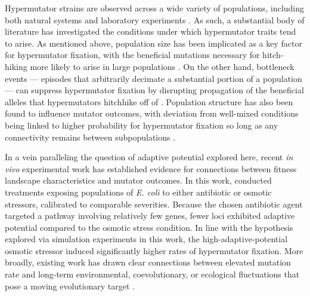 Hypermutator strains are observed across a wide variety of populations, including both natural systems and laboratory experiments \citep{sniegowski1997evolution,swings2017adaptive,maddamsetti2020divergent,cherry2018methylation,notleymcrobb2002enrichment,shaver2002fitness,voordeckers2015adaptation,leclerc1996high}.
As such, a substantial body of literature has investigated the conditions under which hypermutator traits tend to arise.
As mentioned above, population size has been implicated as a key factor for hypermutator fixation, with the beneficial mutations necessary for hitch-hiking more likely to arise in large populations \citep{raynes2018sign}.
On the other hand, bottleneck events --- episodes that arbitrarily decimate a substantial portion of a population --- can suppress hypermutator fixation by disrupting propagation of the beneficial alleles that hypermutators hitchhike off of \citep{raynes2013effect}.
Population structure has also been found to influence mutator outcomes, with deviation from well-mixed conditions being linked to higher probability for hypermutator fixation so long as any connectivity remains between subpopulations \citep{raynes2019migration}.

In a vein paralleling the question of adaptive potential explored here, recent \textit{in vivo} experimental work has established evidence for connections between fitness landscape characteristics and mutator outcomes.
In this work, \citet{callens2023hypermutator} conducted treatments exposing populations of \textit{E. coli} to either antibiotic or osmotic stressors, calibrated to comparable severities.
Because the chosen antibiotic agent targeted a pathway involving relatively few genes, fewer loci exhibited adaptive potential compared to the osmotic stress condition.
In line with the hypothesis explored via simulation experiments in this work, the high-adaptive-potential osmotic stressor induced significantly higher rates of hypermutator fixation.
More broadly, existing work has drawn clear connections between elevated mutation rate and long-term environmental, coevolutionary, or ecological fluctuations that pose a moving evolutionary target \citep{leigh1970natural,travis2002mutator,rosenbloom2014frequencydependent,pal2007coevolution}.

